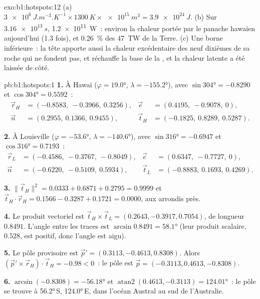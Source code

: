\begin{solution}{exo:b1:hotspots:12}
(a) $\qty{3e6}{J.m^{-3}.K^{-1}}\times\qty{1300}{K}\times\qty{e15}{m^3} =
\qty{3.9e24}{J}$. (b) Sur $\qty{3.16e13}{s}$, \qty{1.2e11}{W}~: environ la
chaleur portée par le panache hawaïen aujourd'hui (1.3 fois), et \qty{0.26}{\percent}
des \qty{47}{TW} de la Terre. (c) Une borne inférieure~: la tête apporte aussi
la chaleur excédentaire des neuf dixièmes de sa roche qui ne fondent pas, et réchauffe la
base de la , et la chaleur latente a été laissée de côté.
\end{solution}

\begin{solution}{pb:b1:hotspots:1}
\textbf{1.} À Hawaï ($\varphi = \ang{19.0}$, $\lambda = \ang{-155.2}$),
avec $\sin\ang{304} = -0.8290$ et $\cos\ang{304} = 0.5592$~:
\[
\begin{aligned}
  \vec r_H &= (-0.8583,\ -0.3966,\ 0.3256), &
  \vec e &= (0.4195,\ -0.9078,\ 0),\\
  \vec n &= (0.2955,\ 0.1366,\ 0.9455), &
  \vec t_H &= (-0.1825,\ 0.8289,\ 0.5287).
\end{aligned}
\]

\textbf{2.} À Louisville ($\varphi = \ang{-53.6}$, $\lambda = \ang{-140.6}$),
avec $\sin\ang{316} = -0.6947$ et $\cos\ang{316} = 0.7193$~:
\[
\begin{aligned}
  \vec r_L &= (-0.4586,\ -0.3767,\ -0.8049), &
  \vec e &= (0.6347,\ -0.7727,\ 0),\\
  \vec n &= (-0.6220,\ -0.5109,\ 0.5934), &
  \vec t_L &= (-0.8883,\ 0.1693,\ 0.4269).
\end{aligned}
\]

\textbf{3.} $\lVert\vec t_H\rVert^2 = 0.0333 + 0.6871 + 0.2795 = 0.9999$ et
$\vec t_H\cdot\vec r_H = 0.1566 - 0.3287 + 0.1721 = 0.0000$, aux arrondis près.

\textbf{4.} Le produit vectoriel est $\vec t_H\times\vec t_L = (0.2643, -0.3917, 0.7054)$, de longueur
$0.8491$. L'angle entre les traces est $\arcsin0.8491 = \ang{58.1}$ (leur
produit scalaire, $0.528$, est positif, donc l'angle est aigu).

\textbf{5.} Le pôle provisoire est $\vec p' = (0.3113, -0.4613, 0.8308)$. Alors
$(\vec p'\times\vec r_H)\cdot\vec t_H = -0.98 < 0$~: le pôle est
$\vec p = (-0.3113, 0.4613, -0.8308)$.

\textbf{6.} $\arcsin(-0.8308) = \ang{-56.18}$ et
$\operatorname{atan2}(0.4613, -0.3113) = \ang{124.01}$~: le pôle se trouve à
\ang{56.2}\,S, \ang{124.0}\,E, dans l'océan Austral au sud de l'Australie.


\end{solution}
